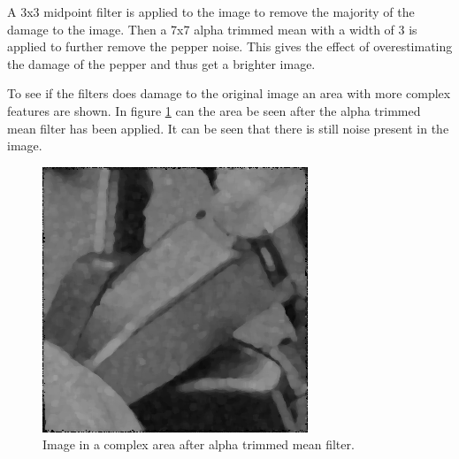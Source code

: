 A 3x3 midpoint filter is applied to the image to remove the majority of the damage to the image.
Then a 7x7 alpha trimmed mean with a width of 3 is applied to further remove the pepper noise.
This gives the effect of overestimating the damage of the pepper and thus get a brighter image.

To see if the filters does damage to the original image an area with more complex features are shown.
In figure \ref{fig:complex1_after_alpha} can the area be seen after the alpha trimmed mean filter has been applied.
It can be seen that there is still noise present in the image.

\begin{figure}[H]
\centering
\includegraphics[width = \cutOutWidth]{graphics/complex1_step2}
\caption{Image in a complex area after alpha trimmed mean filter.}
\label{fig:complex1_after_alpha}
\end{figure}

